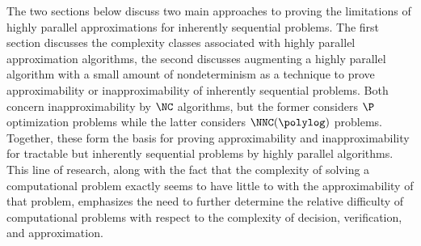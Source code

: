 \documentclass{article}
\begin{document}
%
The two sections below discuss two main approaches to proving the limitations of highly parallel approximations for inherently sequential problems.
The first section discusses the complexity classes associated with highly parallel approximation algorithms, the second discusses augmenting a highly parallel algorithm with a small amount of nondeterminism as a technique to prove approximability or inapproximability of inherently sequential problems.
Both concern inapproximability by $\NC$ algorithms, but the former considers $\P$ optimization problems while the latter considers $\NNC(\polylog)$ problems.
Together, these form the basis for proving approximability and inapproximability for tractable but inherently sequential problems by highly parallel algorithms.
This line of research, along with the fact that the complexity of solving a computational problem exactly seems to have little to with the approximability of that problem, emphasizes the need to further determine the relative difficulty of computational problems with respect to the complexity of decision, verification, and approximation.
\end{document}
